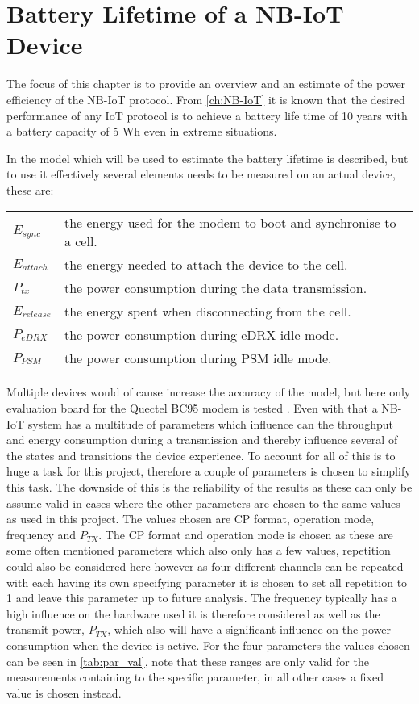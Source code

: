 \chapter{Battery Lifetime of a NB-IoT Device}

The focus of this chapter is to provide an overview and an estimate of the power efficiency of the NB-IoT protocol. From \autoref{ch:NB-IoT} it is known that the desired performance of any IoT protocol is to achieve a battery life time of 10 years with a battery capacity of 5 Wh even in extreme situations. 

In  the model which will be used to estimate the battery lifetime is described, but to use it effectively several elements needs to be measured on an actual device, these are:

\begin{tabular}{ll}
$E_{sync}$ & the energy used for the modem to boot and synchronise to a cell. \\
$E_{attach}$ & the energy needed to attach the device to the cell. \\
$P_{tx}$ & the power consumption during the data transmission. \\
$E_{release}$ & the energy spent when disconnecting from the cell. \\
$P_{eDRX}$ & the power consumption during \gls{eDRX} idle mode. \\
$P_{PSM}$ & the power consumption during \gls{PSM} idle mode. \\
\end{tabular}

Multiple devices would of cause increase the accuracy of the model, but here only evaluation board for the Quectel BC95 modem is tested \citep{BC95}. Even with that a \gls{NB-IoT} system has a multitude of parameters which influence can the throughput and energy consumption during a transmission and thereby influence several of the states and transitions the device experience. To account for all of this is to huge a task for this project, therefore a couple of parameters is chosen to simplify this task. The downside of this is the reliability of the results as these can only be assume valid in cases where the other parameters are chosen to the same values as used in this project. The values chosen are CP format, operation mode, frequency and $P_{TX}$. The CP format and operation mode is chosen as these are some often mentioned parameters which also only has a few values, repetition could also be considered here however as four different channels can be repeated with each having its own specifying parameter it is chosen to set all repetition to 1 and leave this parameter up to future analysis. The frequency typically has a high influence on the hardware used it is therefore considered as well as the transmit power, $P_{TX}$, which also will have a significant influence on the power consumption when the device is active. For the four parameters the values chosen can be seen in \autoref{tab:par_val}, note that these ranges are only valid for the measurements containing to the specific parameter, in all other cases a fixed value is chosen instead.

